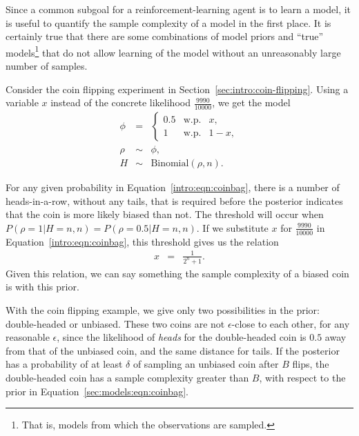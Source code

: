 Since a common subgoal for a reinforcement-learning agent is to learn a model, it is useful to quantify the sample complexity of a model in the first place. It is certainly true that there are some combinations of model priors and ``true'' models\footnote{That is, models from which the observations are sampled.} that do not allow learning of the model without an unreasonably large number of samples.

\begin{example}

Consider the coin flipping experiment in Section~\ref{sec:intro:coin-flipping}. Using a variable $x$ instead of the concrete likelihood $\frac{9990}{10000}$, we get the model
\begin{eqnarray}
\label{sec:models:eqn:coinbag}
\phi &=& \left\{\begin{array}{lll}
0.5 & \mbox{w.p.} & x,\\
1 & \mbox{w.p.} & 1-x,
\end{array}\right.\\
\rho &\sim&\phi,\\
H &\sim& \mbox{Binomial}(\rho, n).
\end{eqnarray}

For any given probability in Equation~\ref{intro:eqn:coinbag}, there is a number of heads-in-a-row, without any tails, that is required before the posterior indicates that the coin is more likely biased than not. The threshold will occur when $P(\rho=1|H=n,n)=P(\rho=0.5|H=n,n)$. If we substitute $x$ for $\frac{9990}{10000}$ in Equation~\ref{intro:eqn:coinbag}, this threshold gives us the relation
\begin{eqnarray}
x &=& \frac{1}{2^n+1}.
\end{eqnarray}
Given this relation, we can say something the sample complexity of a biased coin is with this prior.


With the coin flipping example, we give only two possibilities in the prior: double-headed or unbiased. These two coins are not $\epsilon$-close to each other, for any reasonable $\epsilon$, since the likelihood of \emph{heads} for the double-headed coin is $0.5$ away from that of the unbiased coin, and the same distance for tails. If the posterior has a probability of at least $\delta$ of sampling an unbiased coin after $B$ flips, the double-headed coin has a sample complexity greater than $B$, with respect to the prior in Equation~\ref{sec:models:eqn:coinbag}.


\end{example}
